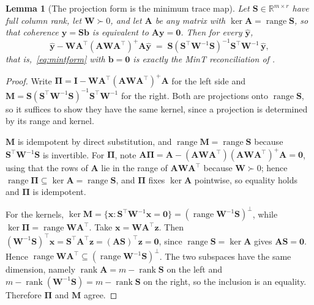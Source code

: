 \documentclass[utf8]{FrontiersinHarvard}
\theoremstyle{plain}
\newtheorem{lemma}[theorem]{Lemma}
\theoremstyle{definition}
\theoremstyle{remark}
\newcommand{\bA}{\bm{A}}
\newcommand{\by}{\bm{y}}
\newcommand{\bb}{\bm{b}}
\newcommand{\yhat}{\hat{\by}}
\newcommand{\Rb}{\mathbb{R}}
\begin{document}
\begin{lemma}[The projection form is the minimum trace map]
\label{lem:mintequiv}
Let $\bm{S} \in \Rb^{m \times r}$ have full column rank, let $\bm{W} \succ 0$, and let $\bA$ be any matrix with $\ker \bA = \operatorname{range}\bm{S}$, so that coherence $\by = \bm{S}\bm{b}$ is equivalent to $\bA\by = \bm{0}$. Then for every $\yhat$,
\begin{equation}
\yhat - \bm{W}\bA^{\top}\left(\bA\bm{W}\bA^{\top}\right)^{+}\bA\yhat
\;=\;
\bm{S}\left(\bm{S}^{\top}\bm{W}^{-1}\bm{S}\right)^{-1}\bm{S}^{\top}\bm{W}^{-1}\,\yhat ,
\label{eq:mintequiv}
\end{equation}
that is,~\eqref{eq:mintform} with $\bb=\bm{0}$ is exactly the MinT reconciliation of \citet{wickramasuriya2019mint}.
\end{lemma}
\begin{proof}
Write $\bm{\Pi} = \bm{I} - \bm{W}\bA^{\top}(\bA\bm{W}\bA^{\top})^{+}\bA$ for the left side and $\bm{M} = \bm{S}(\bm{S}^{\top}\bm{W}^{-1}\bm{S})^{-1}\bm{S}^{\top}\bm{W}^{-1}$ for the right. Both are projections onto $\operatorname{range}\bm{S}$, so it suffices to show they have the same kernel, since a projection is determined by its range and kernel.

$\bm{M}$ is idempotent by direct substitution, and $\operatorname{range}\bm{M} = \operatorname{range}\bm{S}$ because $\bm{S}^{\top}\bm{W}^{-1}\bm{S}$ is invertible. For $\bm{\Pi}$, note $\bA\bm{\Pi} = \bA - (\bA\bm{W}\bA^{\top})(\bA\bm{W}\bA^{\top})^{+}\bA = \bm{0}$, using that the rows of $\bA$ lie in the range of $\bA\bm{W}\bA^{\top}$ because $\bm{W}\succ0$; hence $\operatorname{range}\bm{\Pi} \subseteq \ker\bA = \operatorname{range}\bm{S}$, and $\bm{\Pi}$ fixes $\ker\bA$ pointwise, so equality holds and $\bm{\Pi}$ is idempotent.

For the kernels, $\ker\bm{M} = \{\bm{x} : \bm{S}^{\top}\bm{W}^{-1}\bm{x} = \bm{0}\} = (\operatorname{range}\bm{W}^{-1}\bm{S})^{\perp}$, while $\ker\bm{\Pi} = \operatorname{range}\bm{W}\bA^{\top}$. Take $\bm{x} = \bm{W}\bA^{\top}\bm{z}$. Then $(\bm{W}^{-1}\bm{S})^{\top}\bm{x} = \bm{S}^{\top}\bA^{\top}\bm{z} = (\bA\bm{S})^{\top}\bm{z} = \bm{0}$, since $\operatorname{range}\bm{S} = \ker\bA$ gives $\bA\bm{S}=\bm{0}$. Hence $\operatorname{range}\bm{W}\bA^{\top} \subseteq (\operatorname{range}\bm{W}^{-1}\bm{S})^{\perp}$. The two subspaces have the same dimension, namely $\operatorname{rank}\bA = m - \operatorname{rank}\bm{S}$ on the left and $m - \operatorname{rank}(\bm{W}^{-1}\bm{S}) = m - \operatorname{rank}\bm{S}$ on the right, so the inclusion is an equality. Therefore $\bm{\Pi}$ and $\bm{M}$ agree.
\end{proof}
\end{document}
